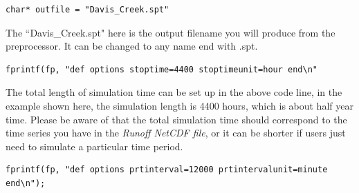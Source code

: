 \documentclass[12pt, letterpaper]{article}
\begin{document}
\begin{appendices}
\begin{flushleft}
\newpage
\lstset{showstringspaces=false}
\begin{lstlisting}[frame=single]
char* outfile = "Davis_Creek.spt"
\end{lstlisting}

The ``Davis\_Creek.spt" here is the output filename you will produce from the preprocessor. It can be changed to any name end with .spt.
\newline
{}
\lstset{showstringspaces=false}
\begin{lstlisting}[frame=single,basicstyle=\small]
fprintf(fp, "def options stoptime=4400 stoptimeunit=hour end\n"
\end{lstlisting}

The total length of simulation time can be set up in the above code line, in the example shown here, the simulation length is 4400 hours, which is about half year time. Please be aware of that the total simulation time should correspond to the time series you have in the \emph{Runoff NetCDF file}, or it can be shorter if users just need to simulate a particular time period. 
\newline
{}
\lstset{showstringspaces=false}

\begin{lstlisting}[frame=single,basicstyle=\footnotesize]
fprintf(fp, "def options prtinterval=12000 prtintervalunit=minute end\n");
\end{lstlisting}


\end{flushleft}
\end{appendices}
\end{document}
